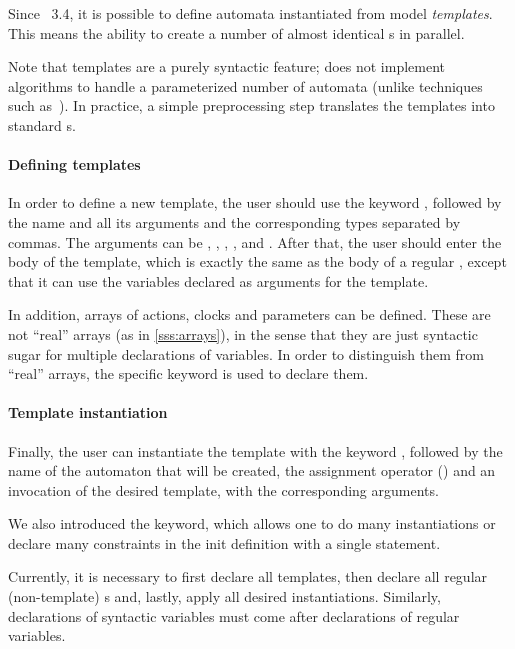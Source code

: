 Since \imitator{}~3.4, it is possible to define automata instantiated from model \emph{templates}.
This means the ability to create a number of almost identical \IPTA{}s in parallel.

Note that templates are a purely syntactic feature; \imitator{} does not implement algorithms to handle a parameterized number of automata (unlike techniques such as~\cite{ADRST16}).
In practice, a simple preprocessing step translates the templates into standard \IPTA{}s.


\paragraph{Defining templates}
In order to define a new template, the user should use the keyword , followed by the name and all its arguments and the corresponding types separated by commas.
The arguments can be , , , ,  and .
%
After that, the user should enter the body of the template, which is exactly the same as the body of a regular \IPTA{}, except that it can use the variables declared as arguments for the template.

In addition, arrays of actions, clocks and parameters can be defined.
These are not ``real'' arrays (as in \cref{sss:arrays}), in the sense that they are just syntactic sugar for multiple declarations of
variables.
In order to distinguish them from ``real'' arrays, the specific keyword  is used to declare them.

\paragraph{Template instantiation}
Finally, the user can instantiate the template with the keyword , followed by the name of the automaton that will be created, the assignment operator (\styleIMI{<-}) and an invocation of the desired template, with the corresponding arguments.

We also introduced the  keyword, which allows one to do many instantiations or declare many constraints in the init definition with a single statement.

Currently, it is necessary to first declare all templates, then declare all regular (non-template) \IPTA{}s and, lastly, apply all desired instantiations.
Similarly, declarations of syntactic variables must come after declarations of regular variables.


